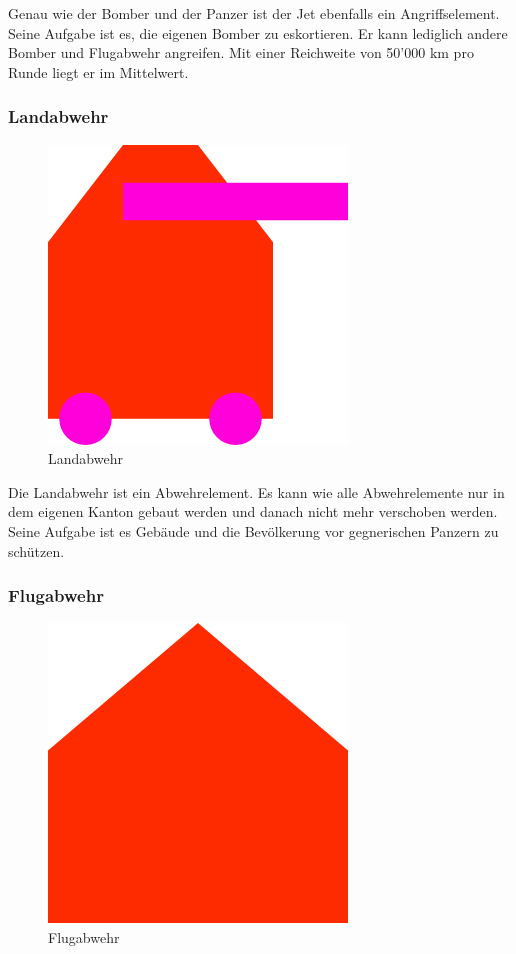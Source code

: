 \documentclass[ngerman, 12pt, pdftex]{scrartcl}[2006/07/30]
\begin{document}
Genau wie der Bomber und der Panzer ist der Jet ebenfalls ein Angriffselement.
Seine Aufgabe ist es, die eigenen Bomber zu eskortieren. Er kann lediglich andere Bomber und Flugabwehr angreifen. Mit einer Reichweite von 50'000 km pro Runde liegt er im Mittelwert.

\subsubsection{Landabwehr}


\begin{figure}[h]
\centering
\includegraphics[scale=18]{spiel/Landabwehr.png}
\caption{Landabwehr}
\end{figure}

Die Landabwehr ist ein Abwehrelement. Es kann wie alle Abwehrelemente nur in dem eigenen Kanton gebaut werden und danach nicht mehr verschoben werden. Seine Aufgabe ist es Gebäude und die Bevölkerung vor gegnerischen Panzern zu schützen.


\newpage

\subsubsection{Flugabwehr}

\begin{figure}[h]
\centering
\includegraphics[scale=18]{spiel/Flugabwehr.png}
\caption{Flugabwehr}
\end{figure}
\end{document}
